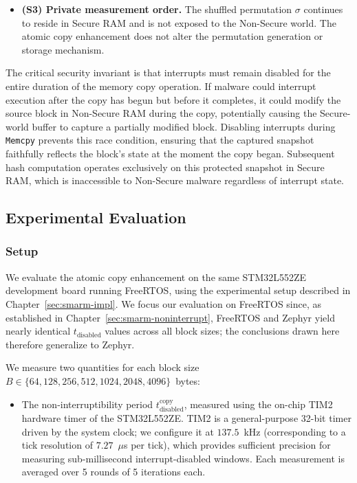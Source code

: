 \documentclass[a4paper,10pt]{article}
\begin{document}
{\begin{itemize}
    \item \textbf{(S3) Private measurement order.} The shuffled 
    permutation $\sigma$ continues to reside in Secure RAM and is 
    not exposed to the Non-Secure world. The atomic copy 
    enhancement does not alter the permutation generation or 
    storage mechanism.
\end{itemize}

The critical security invariant is that interrupts must remain 
disabled for the entire duration of the memory copy operation. 
If malware could interrupt execution after the copy has begun 
but before it completes, it could modify the source block in 
Non-Secure RAM during the copy, potentially causing the Secure-world 
buffer to capture a partially modified block. Disabling interrupts 
during \texttt{Memcpy} prevents this race condition, ensuring that 
the captured snapshot faithfully reflects the block's state at the 
moment the copy began. Subsequent hash computation operates 
exclusively on this protected snapshot in Secure RAM, which is 
inaccessible to Non-Secure malware regardless of interrupt state.


\subsection{Experimental Evaluation}

\subsubsection{Setup}

We evaluate the atomic copy enhancement on the same STM32L552ZE 
development board running FreeRTOS, using the experimental setup 
described in Chapter~\ref{sec:smarm-impl}. We focus our evaluation 
on FreeRTOS since, as established in 
Chapter~\ref{sec:smarm-noninterrupt}, FreeRTOS and Zephyr yield 
nearly identical $t_{\mathrm{disabled}}$ values across all block 
sizes; the conclusions drawn here therefore generalize to Zephyr.

We measure two quantities for each block size 
$B \in \{64, 128, 256, 512, 1024, 2048, 4096\}$~bytes:
\begin{itemize}
     \item The non-interruptibility period 
    $t_{\mathrm{disabled}}^{\text{copy}}$, measured using the 
    on-chip TIM2 hardware timer of the STM32L552ZE. TIM2 is 
    a general-purpose 32-bit timer driven by the system clock; 
    we configure it at $137.5$~kHz (corresponding to a tick 
    resolution of $7.27$~$\mu$s per tick), which provides 
    sufficient precision for measuring sub-millisecond 
    interrupt-disabled windows. Each measurement is averaged 
    over 5 rounds of 5 iterations each.
    

\end{itemize}}
\end{document}
